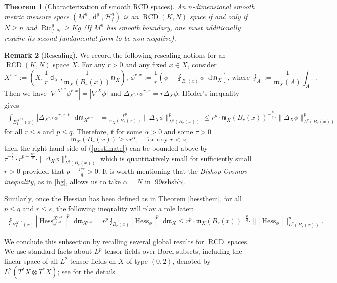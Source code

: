 \documentclass[11pt,reqno]{amsart}
\newtheorem{theorem}{Theorem}[section]
\theoremstyle{definition}
\newtheorem{remark}[theorem]{Remark}
\numberwithin{equation}{section}
\newcommand{\di}{\mathop{}\!\mathrm{d}}
\newcommand{\meas}{\mathfrak{m}}
\DeclareMathOperator{\dist}{\mathsf{d}}
\DeclareMathOperator{\Hess}{Hess}
\DeclareMathOperator{\RCD}{RCD}
\DeclareMathOperator{\Ric}{Ric}
\newcommand{\haus}{\mathscr{H}}
\begin{document}
\begin{theorem}[Characterization of smooth RCD spaces]\label{noboundarycase}
An $n$-dimensional smooth metric measure space $(M^n, \dist^g, \haus^n_f)$  is an $\RCD(K, N)$ space if and only if $N \ge n$ and $\Ric^g_{f, N}\ge Kg$ (If $M^n$ has smooth boundary, one must additionally require its second fundamental form to be non-negative).
\end{theorem}
\begin{remark}[Rescaling]\label{rem:rescal}
    We record the following rescaling notions for an $\RCD(K, N)$ space $X$. 
For any $r>0$ and any fixed $x \in X$, consider
\begin{equation}\label{resnot}
X^{r, x}:=\left(X, \frac{1}{r}\dist_X, \frac{1}{\meas_X(B_r(x))}\meas_X\right),\, \phi^{r, x}:=\frac{1}{r}\left( \phi-\fint_{B_r(x)}\phi\di \meas_X \right),\,\text{where}\,\,\fint_A:=\frac{1}{\meas_X(A)}\int_A. 
\end{equation}
Then 
we have
$
|\nabla^{X^{r,x}} \phi^{r,x}|=|\nabla^X \phi|$ and $
\Delta_{X^{r,x}}\phi^{r,x}=r\Delta_X \phi$.
  H\"older's inequality gives
\begin{align}\label{pestimate}
\int_{B_1^{X^{r, x}}(x)}|\Delta_{X^{r,x}}\phi^{r,x}|^p\di \meas_{X^{r,x}}&=
\frac{r^p}{\meas_X (B_r(x))}  \|\Delta_X \phi\|_{L^p(B_r(x))}^p \le 
r^p\cdot \meas_X(B_r(x))^{-\frac{p}{q}}\cdot \|\Delta_X \phi\|_{L^q(B_s(x))}^p 
\end{align}
 for all $r \le s$ and $p \le q$. Therefore, if for some $\alpha>0$ and some $\tau>0$
\begin{equation}\label{99sshsbb}
    \meas_X(B_r(x)) \ge \tau r^{\alpha},\quad \text{for any $r<s$},
\end{equation}
then the right-hand-side of (\ref{pestimate}) can be bounded above by
$
    \tau^{-\frac{p}{q}}\cdot r^{p-\frac{p\alpha}{q}} \cdot \|\Delta_X \phi\|_{L^q(B_s(x))}^p
$ 
which is quantitatively small for sufficiently small $r>0$ provided that $p-\frac{p\alpha}{q}>0$. It is worth mentioning that the \textit{Bishop-Gromov inequality}, as in \eqref{bg}, allows us to take $\alpha=N$ in \eqref{99sshsbb}.


Similarly, once the Hessian has been defined as in Theorem \ref{hessthem}, for 
all $p \le q$ and $r \le s$, the following inequality will play a role later:
\begin{align*}
    \fint_{B^{X^{r,x}}_1(x)}|\Hess_{\phi^{r,x}}^{X^{r,x}}|^p\di \meas_{X^{r,x}}=r^p\fint_{B_r(x)}|\Hess_{\phi}|^p\di \meas_X\le 
     r^p\cdot \meas_X(B_r(x))^{-\frac{p}{q}}\cdot \||\Hess_{\phi}|\|_{L^q(B_s(x))}^p.
\end{align*}
\end{remark}
We conclude this subsection by recalling several global results for $\RCD$ spaces. We use standard facts about $L^p$-tensor fields over Borel subsets, including the linear space of all $L^2$-tensor fields on $X$ of type $(0,2)$, denoted by $L^2(T^*X\otimes T^*X)$; see \cite{AMSbe, Deng, DG2, DG, Gigli1, GP2, Kcone, LottVillani, Rajala, St1, St2, ZZ} for the details.
\end{document}
